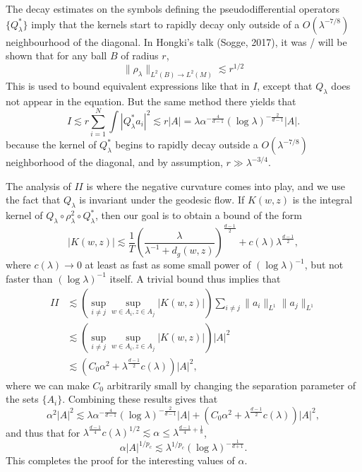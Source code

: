 \documentclass{article}
\theoremstyle{plain}
\theoremstyle{remark}
\theoremstyle{definition}
\begin{document}
The decay estimates on the symbols defining the pseudodifferential operators $\{ Q_\lambda^* \}$ imply that the kernels start to rapidly decay only outside of a $O(\lambda^{-7/8})$ neighbourhood of the diagonal. In Hongki's talk (Sogge, 2017), it was / will be shown that for any ball $B$ of radius $r$,
%
\[ \| \rho_\lambda \|_{L^2(B) \to L^2(M)} \lesssim r^{1/2} \]
%
This is used to bound equivalent expressions like that in $I$, except that $Q_\lambda$ does not appear in the equation. But the same method there yields that
%
\[ I \lesssim r \sum_{i = 1}^N \int |Q_{\lambda}^* a_i|^2 \lesssim r |A| = \lambda \alpha^{- \frac{4}{d-1}} (\log \lambda)^{- \frac{2}{d - 1}} |A|. \]
%
because the kernel of $Q_\lambda^*$ begins to rapidly decay outside a $O(\lambda^{-7/8})$ neighborhood of the diagonal, and by assumption, $r \gg \lambda^{-3/4}$.

The analysis of $II$ is where the negative curvature comes into play, and we use the fact that $Q_\lambda$ is invariant under the geodesic flow. If $K(w,z)$ is the integral kernel of $Q_\lambda \circ \rho_\lambda^2 \circ Q_\lambda^*$, then our goal is to obtain a bound of the form
%
\[ |K(w,z)| \lesssim \frac{1}{T} \left( \frac{\lambda}{\lambda^{-1} + d_g(w,z)} \right)^{\frac{d-1}{2}} + c(\lambda) \lambda^{\frac{d-1}{2}}, \]
%
where $c(\lambda) \to 0$ at least as fast as some small power of $(\log \lambda)^{-1}$, but not faster than $(\log \lambda)^{-1}$ itself. A trivial bound thus implies that
%
\begin{align*}
    II &\lesssim \left( \sup_{i \neq j} \sup_{w \in A_i, z \in A_j} |K(w,z)| \right) \sum_{i \neq j} \| a_i \|_{L^1} \| a_j \|_{L^1}\\
    &\lesssim \left( \sup_{i \neq j} \sup_{w \in A_i, z \in A_j} |K(w,z)| \right) |A|^2\\
    &\lesssim ( C_0 \alpha^2 + \lambda^{\frac{d-1}{2}} c(\lambda) ) |A|^2,
\end{align*}
%
where we can make $C_0$ arbitrarily small by changing the separation parameter of the sets $\{ A_i \}$. Combining these results gives that
%
\[ \alpha^2 |A|^2 \lesssim \lambda \alpha^{- \frac{4}{d-1}} (\log \lambda)^{- \frac{2}{d - 1}} |A| + ( C_0 \alpha^2 + \lambda^{\frac{d-1}{2}} c(\lambda) ) |A|^2, \]
%
and thus that for $\lambda^{\frac{d-1}{4}} c(\lambda)^{1/2} \lesssim \alpha \leq \lambda^{\frac{d-1}{4} + \frac{1}{8}}$,
%
\[ \alpha |A|^{1/p_c} \lesssim \lambda^{1/p_c} (\log \lambda)^{- \frac{1}{d+1}}. \]
%
This completes the proof for the interesting values of $\alpha$.
\end{document}

